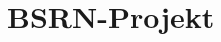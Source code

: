\chapter{BSRN-\/\+Projekt }
\hypertarget{md__r_e_a_d_m_e}{}\label{md__r_e_a_d_m_e}
\label{md__r_e_a_d_m_e_autotoc_md0}%
%
